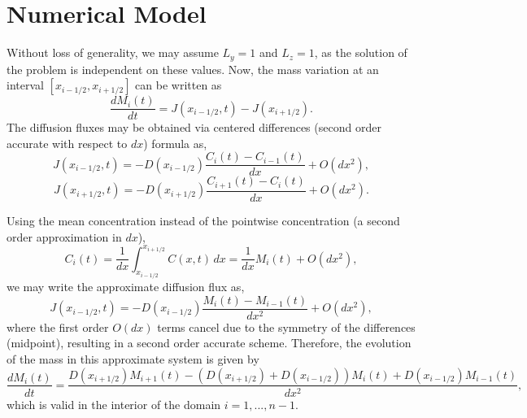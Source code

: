 \documentclass[final,1p,times]{elsarticle}
\begin{document}
\section{Numerical Model}

Without loss of generality, we may assume $L_y=1$ and $L_z=1$, as the solution of the problem is independent on these values. Now, the mass variation at an interval $[x_{i-1/2}, x_{i+1/2}]$ can be written as 
\begin{equation}
\frac{d M_{i}(t)}{dt}= J(x_{i-1/2}, t)-J(x_{i+1/2}).
\end{equation}
The diffusion fluxes may be obtained via centered differences (second order accurate with respect to $dx$) formula as,
 \begin{equation}
 J(x_{i-1/2}, t)=-D(x_{i-1/2})\frac{C_{i}(t)-C_{i-1}(t)}{dx}+O(dx^2),
 \end{equation}
  \begin{equation}
 J(x_{i+1/2}, t)=-D(x_{i+1/2})\frac{C_{i+1}(t)-C_{i}(t)}{dx}+O(dx^2).
 \end{equation}
 
Using the mean concentration instead of the pointwise concentration (a second order approximation in $dx$),
\begin{equation}
C_{i}(t)=\frac{1}{dx}\int_{x_{i-1/2}}^{x_{i+1/2}}C(x,t)\,dx=\frac{1}{dx}M_{i}(t) + O(dx^2),
\end{equation}
we may write the approximate diffusion flux as,
 \begin{equation}
 J(x_{i-1/2}, t)=-D(x_{i-1/2})\frac{M_{i}(t)-M_{i-1}(t)}{dx^2} + O(dx^2),
 \end{equation}
 where the first order $O(dx)$ terms cancel due to the symmetry of the differences (midpoint), resulting in a second order accurate scheme. 
Therefore, the evolution of the mass in this approximate system is given by
\begin{equation}
\frac{d M_{i}(t)}{dt}= \frac{D(x_{i+1/2})M_{i+1}(t)-(D(x_{i+1/2})+D(x_{i-1/2}))M_{i}(t) + D(x_{i-1/2})M_{i-1}(t)}{dx^2},
\end{equation}
which is valid in the interior of the domain $i=1,...,n-1$.
\end{document}
